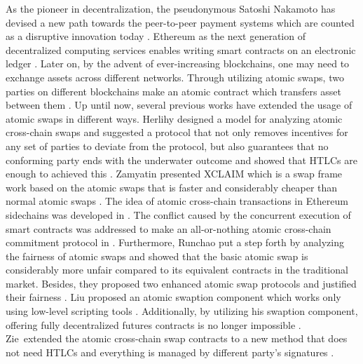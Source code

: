 As the pioneer in decentralization, the pseudonymous Satoshi Nakamoto has devised a new path towards the peer-to-peer payment systems which are counted as a disruptive innovation today . Ethereum as the next generation of decentralized computing services enables writing smart contracts on an electronic ledger . Later on, by the advent of ever-increasing blockchains, one may need to exchange assets across different networks. Through utilizing atomic swaps, two parties on different blockchains make an atomic contract which transfers asset between them . Up until now, several previous works have extended the usage of atomic swaps in different ways. Herlihy designed a model for analyzing atomic cross-chain swaps and suggested a protocol that not only removes incentives for any set of parties to deviate from the protocol, but also guarantees that no conforming party ends with the underwater outcome and showed that HTLCs are enough to achieved this . Zamyatin \etal presented X{\footnotesize CLAIM} which is a swap frame work based on the atomic swaps that is faster and considerably cheaper than normal atomic swaps .
The idea of atomic cross-chain transactions in Ethereum sidechains was developed in . The conflict caused by the concurrent execution of smart contracts was addressed to make an all-or-nothing atomic cross-chain commitment protocol in . Furthermore, Runchao \etal put a step forth by analyzing the fairness of atomic swaps and showed that the basic atomic swap is considerably more unfair compared to its equivalent contracts in the traditional market. Besides, they proposed two enhanced atomic swap protocols and justified their fairness .
Liu proposed an atomic swaption component which works only using low-level scripting tools . Additionally, by utilizing his swaption component, offering fully decentralized futures contracts is no longer impossible .
Zie~\etal extended the atomic cross-chain swap contracts to a new method that does not need HTLCs and everything is managed by different party's signatures .


